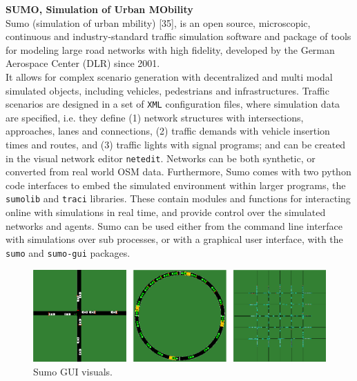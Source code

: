 \textbf{SUMO, Simulation of Urban MObility} \\
Sumo (simulation of urban mbility) [35], is an open source, microscopic, continuous and industry-standard traffic simulation software and package of tools for modeling large road networks with high fidelity, developed by the German Aerospace Center (DLR) since 2001. \\ 
It allows for complex scenario generation with decentralized and multi modal simulated objects, including vehicles, pedestrians and infrastructures. Traffic scenarios are designed in a set of \texttt{XML} configuration files, where simulation data are specified, i.e. they define (1) network structures with intersections, approaches, lanes and connections, (2) traffic demands with vehicle insertion times and routes, and (3) traffic lights with signal programs; and can be created in the visual network editor \texttt{netedit}. Networks can be both synthetic, or converted from real world OSM data. Furthermore, Sumo comes with two python code interfaces to embed the simulated environment within larger programs, the \texttt{sumolib} and \texttt{traci} libraries. These contain modules and functions for interacting online with simulations in real time, and provide control over the simulated networks and agents. Sumo can be used either from the command line interface with simulations over sub processes, or with a graphical user interface, with the \texttt{sumo} and \texttt{sumo-gui} packages.

\begin{figure}[h]
\includegraphics[width=\textwidth]{img/II/Selection_111.png}
\centering
\captionsetup{justification=centering}
\caption{Sumo GUI visuals.}
\end{figure}

\restoregeometry

\pagebreak